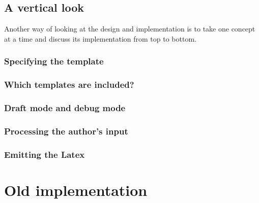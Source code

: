 \documentclass[11pt]{article}
\begin{document}
\subsection{A vertical look}

Another way of looking at the design and implementation is to take one concept at a time and discuss its implementation from top to bottom.


\subsubsection{Specifying the template}


\subsubsection{Which templates are included?}


\subsubsection{Draft mode and debug mode}


\subsubsection{Processing the author's input}


\subsubsection{Emitting the Latex}

\pagebreak


\section{Old implementation}
\end{document}
